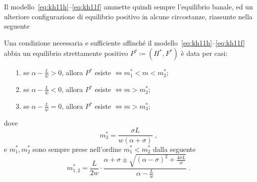 Il modello~\eqref{eq:kh11h}--\eqref{eq:kh11f} ammette quindi sempre l'equilibrio banale, ed un ulteriore
configurazione di equilibrio positivo in alcune circostanze, riassunte nella seguente
\begin{proposizione}
    Una condizione necessaria e sufficiente affinché il modello~\eqref{eq:kh11h}--\eqref{eq:kh11f} abbia
    un equilibrio strettamente positivo $P^* \coloneq (H^*, F^*)$ è data per casi:
    \begin{itemize}
        \item[1.] se $\alpha - \frac{L}{w} >0$, allora $P^*$ esiste $\iff m_1^* < m < m_2^*$;
        \item[2.] se $\alpha - \frac{L}{w} <0$, allora $P^*$ esiste $\iff m > m_2^*$;
        \item[3.] se $\alpha - \frac{L}{w} =0$, allora $P^*$ esiste $\iff m > m_3^*$;
    \end{itemize}
    dove
    \begin{equation}
        m_3^* = \frac{ \sigma L}{ w (\alpha + \sigma) } \; ,
        \label{eq:FstarPosM3}
    \end{equation}
    e $m_1^*, m_2^*$ sono sempre prese nell'ordine $m_1^* < m_2^*$ dalla seguente
    \begin{equation}
        m_{1,2}^* = \frac{L}{2w} \cdot \frac{ \alpha + \sigma \pm \sqrt{ {(\alpha - \sigma)}^2 +\frac{4 \sigma L}{w}  } }
        {\alpha -\frac{L}{w}} \; .
        \label{eq:FstarPosM12}
    \end{equation}

    \label{teo:esistenzPosF} %
\end{proposizione}

